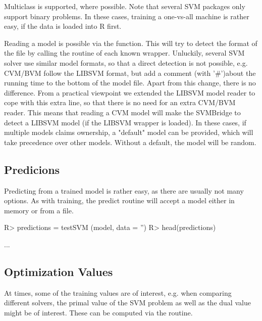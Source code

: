 \documentclass[article, shortnames]{jss}
\begin{document}
Multiclass is supported, where possible.
Note that several SVM packages only support binary problems.
In these cases, training a one-vs-all machine is rather easy, if the
data is loaded into R first. 


Reading a model is possible via the  function.
This will try to detect the format of the file by calling the 
 routine of each known wrapper.
Unluckily, several SVM solver use similar model formats, so that
a direct detection is not possible, e.g. CVM/BVM follow the LIBSVM
format, but add a comment (with '\#')about the running time to the
bottom of the model file. Apart from this change, there is no difference.
From a practical viewpoint we extended the LIBSVM model reader
to cope with this extra line, so that there is no need for an extra CVM/BVM reader.
This means that reading a CVM model will make the SVMBridge to detect a LIBSVM
model (if the LIBSVM wrapper is loaded).
In these cases, if multiple models claims ownership, a "default" model can be provided,
which will take precedence over other models. Without a default,
the model will be random.


\subsection{Predicions}

Predicting from a trained model is rather easy, as there are usually not many options.
As with training, the predict routine will accept a model either in memory or from a file.

\begin{CodeChunk}
\begin{CodeInput}
R> predictions = testSVM (model, data = '')
R> head(predictions)
\end{CodeInput}
\begin{CodeOutput}
...
\end{CodeOutput}
\end{CodeChunk}


\subsection{Optimization Values}

At times, some of the training values are of interest,
e.g. when comparing different solvers, the primal value
of the SVM problem as well as the dual value might  be of interest.
These can be computed via the  routine.
\end{document}
